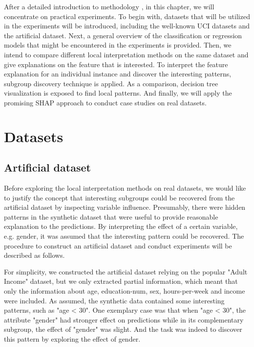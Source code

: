 After a detailed introduction to methodology , in this chapter, we will concentrate on practical experiments. To begin with, datasets that will be utilized in the experiments will be introduced, including the well-known UCI datasets and the artificial dataset. Next, a general overview of the classification or regression models that might be encountered in the experiments is provided. Then, we intend to compare different local interpretation methods on the same dataset and give explanations on the feature that is interested. To interpret the feature explanation for an individual instance and discover the interesting patterns, subgroup discovery technique is applied. As a comparison, decision tree visualization is exposed to find local patterns. And finally, we will apply the promising SHAP approach to conduct case studies on real datasets. 

\section{Datasets}


\subsection{Artificial dataset}

Before exploring the local interpretation methods on real datasets, we would like to justify the concept that interesting subgroups could be recovered from the artificial dataset by inspecting variable influence. Presumably, there were hidden patterns in the synthetic dataset that were useful to provide reasonable explanation to the predictions. By interpreting the effect of a certain variable, e.g. gender, it was assumed that the interesting pattern could be recovered. The procedure to construct an artificial dataset and conduct experiments will be described as follows. 

For simplicity, we constructed the artificial dataset relying on the popular "Adult Income" dataset, but we only extracted partial information, which meant that only the information about age, education-num, sex, hours-per-week and income were included. As assumed, the synthetic data contained some interesting patterns, such as "age < 30". One exemplary case was that when "age < 30", the attribute "gender" had stronger effect on predictions while in its complementary subgroup, the effect of "gender" was slight. And the task was indeed to discover this pattern by exploring the effect of gender. 

